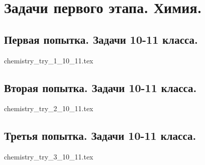 \chapter{Задачи первого этапа. Химия.}

\section{Первая попытка. Задачи 10-11 класса.}

{chemistry_try_1_10_11.tex}

\section{Вторая попытка. Задачи 10-11 класса.}

{chemistry_try_2_10_11.tex}

\section{Третья попытка. Задачи 10-11 класса.}

{chemistry_try_3_10_11.tex}
